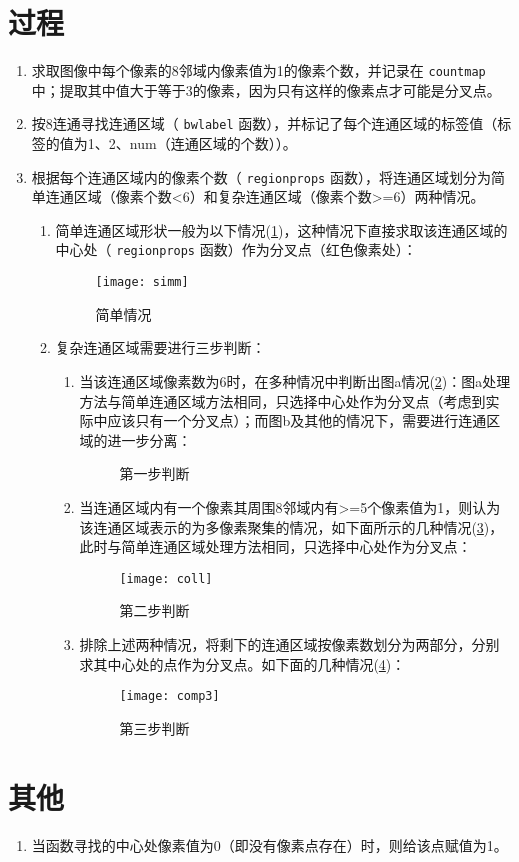 \documentclass[12pt]{article}
\begin{document}
\section{过程}
\begin{enumerate}
\item 求取图像中每个像素的8邻域内像素值为1的像素个数，并记录在 \verb|countmap| 中；提取其中值大于等于3的像素，因为只有这样的像素点才可能是分叉点。
\item 按8连通寻找连通区域（ \verb|bwlabel| 函数），并标记了每个连通区域的标签值（标签的值为1、2、num（连通区域的个数））。
\item 根据每个连通区域内的像素个数（ \verb|regionprops| 函数），将连通区域划分为简单连通区域（像素个数<6）和复杂连通区域（像素个数>=6）两种情况。
\begin{enumerate}
\item 简单连通区域形状一般为以下情况(\ref{fig:sim})，这种情况下直接求取该连通区域的中心处（ \verb|regionprops| 函数）作为分叉点（红色像素处）：
\begin{figure}[ht]
\centering
\texttt{[image: simm]}
\label{fig:sim}
\caption{简单情况}
\end{figure}
\item 复杂连通区域需要进行三步判断：
\begin{enumerate}
\item 当该连通区域像素数为6时，在多种情况中判断出图a情况(\ref{fig:com1})：图a处理方法与简单连通区域方法相同，只选择中心处作为分叉点（考虑到实际中应该只有一个分叉点）；而图b及其他的情况下，需要进行连通区域的进一步分离：
\begin{figure}[ht]
\centering
{}
\hspace{1.5in}
\label{fig:com1}
\caption{第一步判断}
\end{figure}

\item 当连通区域内有一个像素其周围8邻域内有>=5个像素值为1，则认为该连通区域表示的为多像素聚集的情况，如下面所示的几种情况(\ref{fig:coll})，此时与简单连通区域处理方法相同，只选择中心处作为分叉点：
\begin{figure}[ht!]
\centering
\texttt{[image: coll]}
\label{fig:coll}
\caption{第二步判断}
\end{figure}
\item 排除上述两种情况，将剩下的连通区域按像素数划分为两部分，分别求其中心处的点作为分叉点。如下面的几种情况(\ref{fig:comp3})：
\begin{figure}[ht!]
\centering
\texttt{[image: comp3]}
\label{fig:comp3}
\caption{第三步判断}
\end{figure}
\end{enumerate}
\end{enumerate}
\end{enumerate}

\section{其他}
\begin{enumerate}
\item 当函数寻找的中心处像素值为0（即没有像素点存在）时，则给该点赋值为1。
\end{enumerate}
\end{document}
